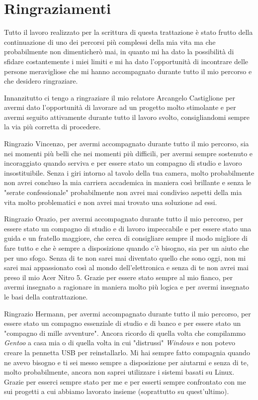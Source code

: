 \chapter{Ringraziamenti}
Tutto il lavoro realizzato per la scrittura di questa trattazione è stato frutto della continuazione di uno dei percorsi più complessi della mia vita ma che probabilmente non dimenticherò mai, in quanto mi ha dato la possibilità di sfidare costantemente i miei limiti e mi ha dato l'opportunità di incontrare delle persone meravigliose che mi hanno accompagnato durante tutto il mio percorso e che desidero ringraziare.

Innanzitutto ci tengo a ringraziare il mio relatore Arcangelo Castiglione per avermi dato l'opportunità di lavorare ad un progetto molto stimolante e per avermi seguito attivamente durante tutto il lavoro svolto, consigliandomi sempre la via più corretta di procedere.

Ringrazio Vincenzo, per avermi accompagnato durante tutto il mio percorso, sia nei momenti più belli che nei momenti più difficili, per avermi sempre sostenuto e incoraggiato quando serviva e per essere stato un compagno di studio e lavoro insostituibile. Senza i giri intorno al tavolo della tua camera, molto probabilmente non avrei concluso la mia carriera accademica in maniera così brillante e senza le "serate confessionale" probabilmente non avrei mai condiviso aspetti della mia vita molto problematici e non avrei mai trovato una soluzione ad essi. 

Ringrazio Orazio, per avermi accompagnato durante tutto il mio percorso, per essere stato un compagno di studio e di lavoro impeccabile e per essere stato una guida e un fratello maggiore, che cerca di consigliare sempre il modo migliore di fare tutto e che è sempre a disposizione quando c'è bisogno, sia per un aiuto che per uno sfogo. Senza di te non sarei mai diventato quello che sono oggi, non mi sarei mai appassionato così al mondo dell'elettronica e senza di te non avrei mai preso il mio Acer Nitro 5. Grazie per essere stato sempre al mio fianco, per avermi insegnato a ragionare in maniera molto più logica e per avermi insegnato le basi della contrattazione.

Ringrazio Hermann, per avermi accompagnato durante tutto il mio percorso, per essere stato un compagno essenziale di studio e di banco e per essere stato un "compagno di mille avventure". Ancora ricordo di quella volta che compilammo \emph{Gentoo} a casa mia o di quella volta in cui "distrussi" \emph{Windows} e non potevo creare la pennetta USB per reinstallarlo. Mi hai sempre fatto compagnia quando ne avevo bisogno e ti sei messo sempre a disposizione per aiutarmi e senza di te, molto probabilmente, ancora non saprei utilizzare i sistemi basati su Linux. Grazie per esserci sempre stato per me e per esserti sempre confrontato con me sui progetti a cui abbiamo lavorato insieme (soprattutto su quest'ultimo).

